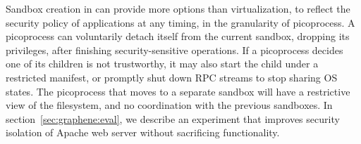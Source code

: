 

Sandbox creation in \graphene{} can provide
more options than virtualization, to reflect the security policy of applications at any timing,
in the granularity of picoprocess. 
A picoprocess can voluntarily detach itself from the current sandbox, dropping its privileges,
after finishing security-sensitive operations.
If a picoprocess decides one of its children is not trustworthy, it may also start the child under a restricted manifest,
or promptly shut down RPC streams to stop sharing OS states.
The picoprocess that moves to a separate sandbox will have a restrictive view of the filesystem, and no coordination with the previous sandboxes.
In section~\ref{sec:graphene:eval}, we describe an experiment that improves security isolation of Apache web server without sacrificing functionality.



